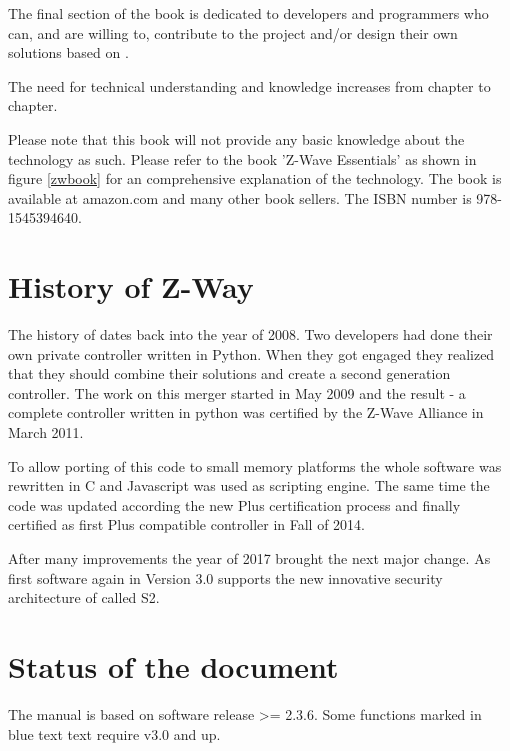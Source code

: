 The final section of the book is dedicated to developers and programmers who can, and are 
willing to, contribute to the project and/or design their own solutions based on \zway.

The need for technical understanding and knowledge increases from chapter to chapter.

Please note that this book will not provide any basic knowledge about the \zwave technology
as such. Please
refer to the book 'Z-Wave Essentials' as shown in figure \ref{zwbook} for an comprehensive
explanation of the \zwave technology. The book is available at amazon.com and many other 
book sellers. The ISBN number is 978-1545394640.


\section{History of Z-Way}

The history of \zway dates back into the year of 2008. Two developers had done their own
private \zwave controller written in Python. When they got engaged they realized that
they should combine their solutions and create a second generation \zwave controller.
The work on this merger started in May 2009 and the result - a complete \zwave controller 
written in python was certified by the Z-Wave Alliance in March 2011.


To allow porting of this code to small memory platforms the whole software was rewritten
in C and Javascript was used as scripting engine. The same time the code was updated according 
the new \zwave Plus certification process and finally certified as first \zwave Plus 
compatible controller in Fall of 2014.
 
 
After many improvements the year of 2017 brought the next major change. As first software 
again \zway in Version 3.0 supports the new innovative security architecture of \zwave 
called S2.

\section{Status of the document}

The manual is based on \zway software release >= 2.3.6. Some functions marked in blue text
text require \zway v3.0 and up.
